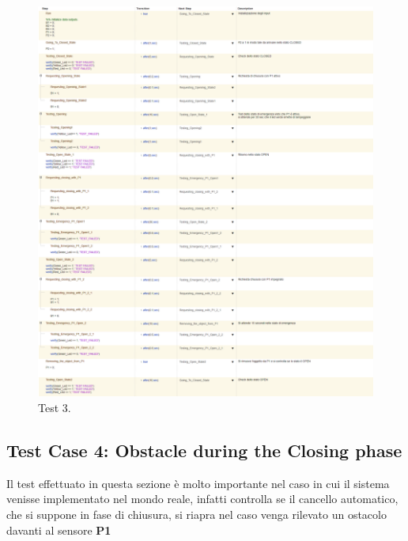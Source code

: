 \documentclass[12pt]{article}
\begin{document}
\begin{figure}[!htbp]
    \vspace{-1cm} %
    \hspace{-2.3cm} %
    \includegraphics[width=1.3\textwidth]{Immagini_Test/Test_3_img.PNG}
    \caption{Test 3.}
    \label{fig:Test_3}
\end{figure}


\subsection{Test Case 4: Obstacle during the Closing phase}

Il test effettuato in questa sezione è molto importante nel caso in cui il sistema venisse implementato nel mondo reale, infatti controlla se il cancello automatico, che si suppone in fase di chiusura, si riapra nel caso venga rilevato un ostacolo davanti al sensore \textbf{P1}
\end{document}
